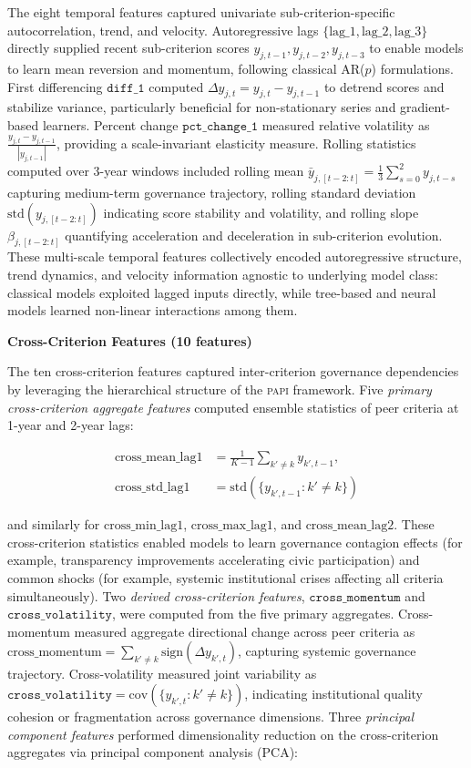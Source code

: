 \documentclass[12pt,a4paper]{article}
\newcommand{\PAPI}{\textsc{papi}\xspace}
\begin{document}
The eight temporal features captured univariate sub-criterion-specific autocorrelation, trend, and velocity. Autoregressive lags $\{\text{lag\_1}, \text{lag\_2}, \text{lag\_3}\}$ directly supplied recent sub-criterion scores $y_{j,t-1}, y_{j,t-2}, y_{j,t-3}$ to enable models to learn mean reversion and momentum, following classical AR($p$) formulations. First differencing $\texttt{diff\_1}$ computed $\Delta y_{j,t} = y_{j,t} - y_{j,t-1}$ to detrend scores and stabilize variance, particularly beneficial for non-stationary series and gradient-based learners. Percent change $\texttt{pct\_change\_1}$ measured relative volatility as $\frac{y_{j,t} - y_{j,t-1}}{|y_{j,t-1}|}$, providing a scale-invariant elasticity measure. Rolling statistics computed over 3-year windows included rolling mean $\bar{y}_{j,[t-2:t]} = \frac{1}{3}\sum_{s=0}^{2} y_{j,t-s}$ capturing medium-term governance trajectory, rolling standard deviation $\text{std}(y_{j,[t-2:t]})$ indicating score stability and volatility, and rolling slope $\beta_{j,[t-2:t]}$ quantifying acceleration and deceleration in sub-criterion evolution. These multi-scale temporal features collectively encoded autoregressive structure, trend dynamics, and velocity information agnostic to underlying model class: classical models exploited lagged inputs directly, while tree-based and neural models learned non-linear interactions among them.

\textbf{Cross-Criterion Features (10 features)}

The ten cross-criterion features captured inter-criterion governance dependencies by leveraging the hierarchical structure of the \PAPI framework. Five \emph{primary cross-criterion aggregate features} computed ensemble statistics of peer criteria at 1-year and 2-year lags:

\vspace{-25pt}
\begin{align*}
\text{cross\_mean\_lag1} &= \frac{1}{K-1}\sum_{k' \neq k} y_{k',t-1}, \\
\text{cross\_std\_lag1} &= \text{std}(\{y_{k',t-1} : k' \neq k\})
\end{align*}
\vspace{-20pt}

and similarly for $\text{cross\_min\_lag1}$, $\text{cross\_max\_lag1}$, and $\text{cross\_mean\_lag2}$. These cross-criterion statistics enabled models to learn governance contagion effects (for example, transparency improvements accelerating civic participation) and common shocks (for example, systemic institutional crises affecting all criteria simultaneously). Two \emph{derived cross-criterion features}, $\texttt{cross\_momentum}$ and $\texttt{cross\_volatility}$, were computed from the five primary aggregates. Cross-momentum measured aggregate directional change across peer criteria as $\text{cross\_momentum} = \sum_{k' \neq k} \text{sign}(\Delta y_{k',t})$, capturing systemic governance trajectory. Cross-volatility measured joint variability as $\texttt{cross\_volatility} = \text{cov}(\{y_{k',t} : k' \neq k\})$, indicating institutional quality cohesion or fragmentation across governance dimensions. Three \emph{principal component features} performed dimensionality reduction on the cross-criterion aggregates via principal component analysis (PCA):
\end{document}
